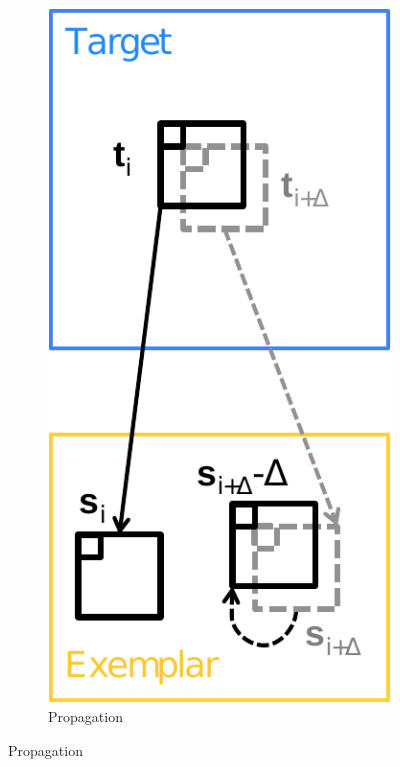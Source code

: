 \begin{figure}[h]
\centering
	\begin{subfigure}[t]{0.155\textwidth}
		\includegraphics[width=\textwidth]{figures/propagation_text2}
		\caption{Propagation}

\end{subfigure}
\end{figure}
